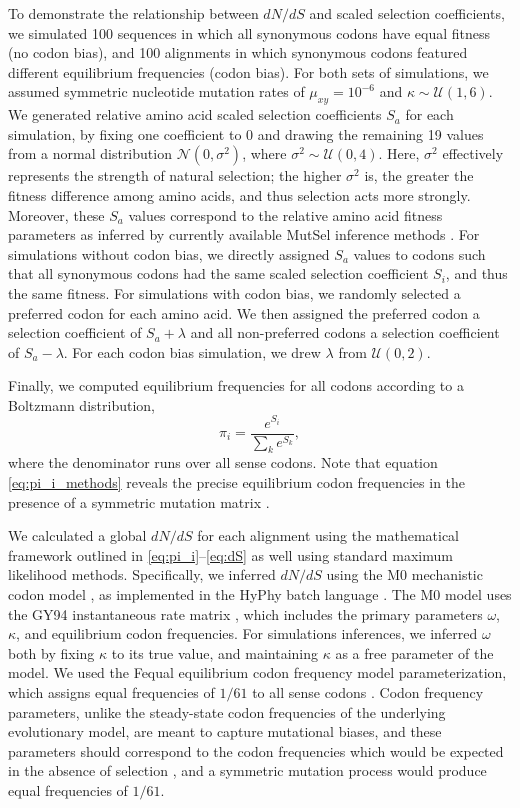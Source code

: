 \documentclass{pnastwo}
\begin{document}
\begin{article}
To demonstrate the relationship between $dN/dS$ and scaled selection coefficients, we simulated 100 sequences in which all synonymous codons have equal fitness (no codon bias), and 100 alignments in which synonymous codons featured different equilibrium frequencies (codon bias). For both sets of simulations, we assumed symmetric nucleotide mutation rates of $\mu_{xy} = 10^{-6}$ and $\kappa \sim \mathcal{U} (1,6)$. We generated relative amino acid scaled selection coefficients $S_a$ for each simulation, by fixing one coefficient to 0 and drawing the remaining 19 values from a normal distribution $\mathcal{N}(0,\sigma^2)$, where $\sigma^2 \sim \mathcal{U}(0,4)$. Here, $\sigma^2$ effectively represents the strength of natural selection; the higher $\sigma^2$ is, the greater the fitness difference among amino acids, and thus selection acts more strongly. Moreover, these $S_a$ values correspond to the relative amino acid fitness parameters as inferred by currently available MutSel inference methods \cite{RodrigueLartillot2014,Tamurietal2014}.
For simulations without codon bias, we directly assigned $S_a$ values to codons such that all synonymous codons had the same scaled selection coefficient $S_i$, and thus the same fitness.  For simulations with codon bias, we randomly selected a preferred codon for each amino acid. We then assigned the preferred codon a selection coefficient of $S_a + \lambda$ and all non-preferred codons a selection coefficient of $S_a - \lambda$. For each codon bias simulation, we drew $\lambda$ from $\mathcal{U}(0,2)$.

Finally, we computed equilibrium frequencies for all codons according to a Boltzmann distribution,  
\begin{equation}\label{eq:pi_i_methods} \pi_i=\frac{e^{S_i}}{\sum_k e^{S_k}}, \end{equation}
where the denominator runs over all sense codons. Note that equation \eqref{eq:pi_i_methods} reveals the precise equilibrium codon frequencies in the presence of a symmetric mutation matrix \cite{SellaHirsh2005}.

We calculated a global $dN/dS$ for each alignment using the mathematical framework outlined in \eqref{eq:pi_i}--\eqref{eq:dS} as well using standard maximum likelihood methods. Specifically, we inferred $dN/dS$ using the M0 mechanistic codon model \cite{Yangetal2000}, as implemented in the HyPhy batch language \cite{KosakovskyPondetal2005}. The M0 model uses the GY94 instantaneous rate matrix \cite{GoldmanYang1994,NielsenYang1998}, which includes the primary parameters $\omega$, $\kappa$, and equilibrium codon frequencies. For simulations inferences, we inferred $\omega$ both by fixing $\kappa$ to its true value, and maintaining $\kappa$ as a free parameter of the model. We used the Fequal equilibrium codon frequency model parameterization, which assigns equal frequencies of $1/61$ to all sense codons \cite{Yang2006}. Codon frequency parameters, unlike the steady-state codon frequencies of the underlying evolutionary model, are meant to capture mutational biases, and these parameters should correspond to the codon frequencies which would be expected in the absence of selection \cite{YN00}, and a symmetric mutation process would produce equal frequencies of $1/61$.



\end{article}
\end{document}
